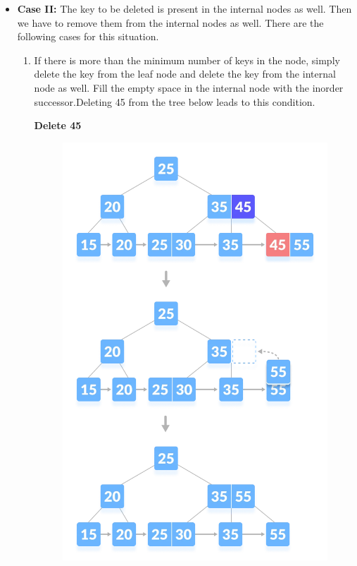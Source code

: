 \documentclass{article}
\begin{document}
    \begin{itemize}
        \item \textbf{Case II:} The key to be deleted is present in the internal nodes as well. Then we have to remove them from the internal nodes as well. There are the following cases for this situation.
        \begin{enumerate}
            \item If there is more than the minimum number of keys in the node, simply delete the key from the leaf node and delete the key from the internal node as well. Fill the empty space in the internal node with the inorder successor.Deleting 45 from the tree below leads to this condition.\\
            \begin{center}
                 \color{red}\textbf{Delete 45}
            \end{center}
            \begin{figure}[ht]
                \centering
                \includegraphics[scale = 0.4]{Images/deletion-3.png}

\end{figure}
\end{enumerate}
\end{itemize}
\end{document}
